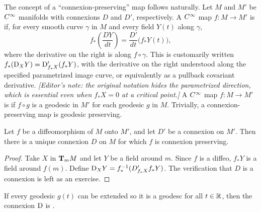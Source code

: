 \documentclass[../main]{subfiles}
\begin{document}
The concept of a ``connexion-preserving'' map follows naturally. Let $M$ and $M'$ be $\CInfty$ manifolds with connexions $D$ and $D'$, respectively. A $\CInfty$ map $f\colon M\longrightarrow M'$ is  if, for every smooth curve $\gamma$ in $M$ and every field $Y(t)$ along $\gamma$,
\[
    f_*\left(\frac{D Y}{dt}\right)
    = \frac{D'}{dt}\bigl(f_*Y(t)\bigr),
\]
where the derivative on the right is along $f\circ\gamma$. This is customarily written $f_*(\connection_XY)=\connection'_{f_*X}(f_*Y)$, with the derivative on the right understood along the specified parametrized image curve, or equivalently as a pullback covariant derivative. \emph{[Editor's note: the original notation hides the parametrized direction, which is essential even when $f_*X=0$ at a critical point.]} A $\CInfty$ map $f\colon M\longrightarrow M'$ is  if $f\circ g$ is a geodesic in $M'$ for each geodesic $g$ in $M$. Trivially, a connexion-preserving map is geodesic preserving.



\begin{theorem} \label{thm:ch5.1.3}
Let $f$ be a diffeomorphism of $M$ onto $M'$, and let $D'$ be a connexion on $M'$. Then there is a unique connexion $D$ on $M$ for which $f$ is connexion preserving.
\end{theorem}

\begin{proof}
Take $X$ in $\tangentspace{M}{m}$ and let $Y$ be a field around $m$. Since $f$ is a diffeo, $f_* Y$ is a field around $f(m)$. Define $\connection_X Y = f_*^{-1}(D'_{f_*X} f_* Y)$. The verification that $D$ is a connexion is left as an exercise.
\end{proof}



If every geodesic $g(t)$ can be extended so it is a geodesc for all $t \in \bbR$, then the connexion $\connection$ is .
\end{document}
